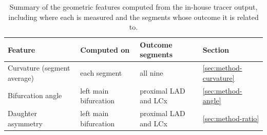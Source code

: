 \begin{table}[htbp]
  \centering
  \caption{Summary of the geometric features computed from the in-house tracer output, including where each is measured and the segments whose outcome it is related to.}
  \label{tab:method-features}
  \begin{tabular}{llll}
    \toprule
    Feature & Computed on & Outcome segments & Section \\
    \midrule
    Curvature (segment average) & each segment & all nine & \ref{sec:method-curvature} \\
    Bifurcation angle & left main bifurcation & proximal LAD and LCx & \ref{sec:method-angle} \\
    Daughter asymmetry & left main bifurcation & proximal LAD and LCx & \ref{sec:method-ratio} \\
    \bottomrule
  \end{tabular}
\end{table}




